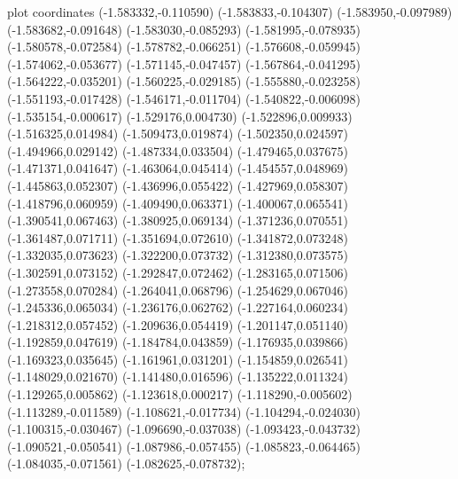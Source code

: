 { plot coordinates {(-1.583332,-0.110590) (-1.583833,-0.104307) (-1.583950,-0.097989) (-1.583682,-0.091648) (-1.583030,-0.085293) (-1.581995,-0.078935) (-1.580578,-0.072584) (-1.578782,-0.066251) (-1.576608,-0.059945) (-1.574062,-0.053677) (-1.571145,-0.047457) (-1.567864,-0.041295) (-1.564222,-0.035201) (-1.560225,-0.029185) (-1.555880,-0.023258) (-1.551193,-0.017428) (-1.546171,-0.011704) (-1.540822,-0.006098) (-1.535154,-0.000617) (-1.529176,0.004730) (-1.522896,0.009933) (-1.516325,0.014984) (-1.509473,0.019874) (-1.502350,0.024597) (-1.494966,0.029142) (-1.487334,0.033504) (-1.479465,0.037675) (-1.471371,0.041647) (-1.463064,0.045414) (-1.454557,0.048969) (-1.445863,0.052307) (-1.436996,0.055422) (-1.427969,0.058307) (-1.418796,0.060959) (-1.409490,0.063371) (-1.400067,0.065541) (-1.390541,0.067463) (-1.380925,0.069134) (-1.371236,0.070551) (-1.361487,0.071711) (-1.351694,0.072610) (-1.341872,0.073248) (-1.332035,0.073623) (-1.322200,0.073732) (-1.312380,0.073575) (-1.302591,0.073152) (-1.292847,0.072462) (-1.283165,0.071506) (-1.273558,0.070284) (-1.264041,0.068796) (-1.254629,0.067046) (-1.245336,0.065034) (-1.236176,0.062762) (-1.227164,0.060234) (-1.218312,0.057452) (-1.209636,0.054419) (-1.201147,0.051140) (-1.192859,0.047619) (-1.184784,0.043859) (-1.176935,0.039866) (-1.169323,0.035645) (-1.161961,0.031201) (-1.154859,0.026541) (-1.148029,0.021670) (-1.141480,0.016596) (-1.135222,0.011324) (-1.129265,0.005862) (-1.123618,0.000217) (-1.118290,-0.005602) (-1.113289,-0.011589) (-1.108621,-0.017734) (-1.104294,-0.024030) (-1.100315,-0.030467) (-1.096690,-0.037038) (-1.093423,-0.043732) (-1.090521,-0.050541) (-1.087986,-0.057455) (-1.085823,-0.064465) (-1.084035,-0.071561) (-1.082625,-0.078732)};
}
